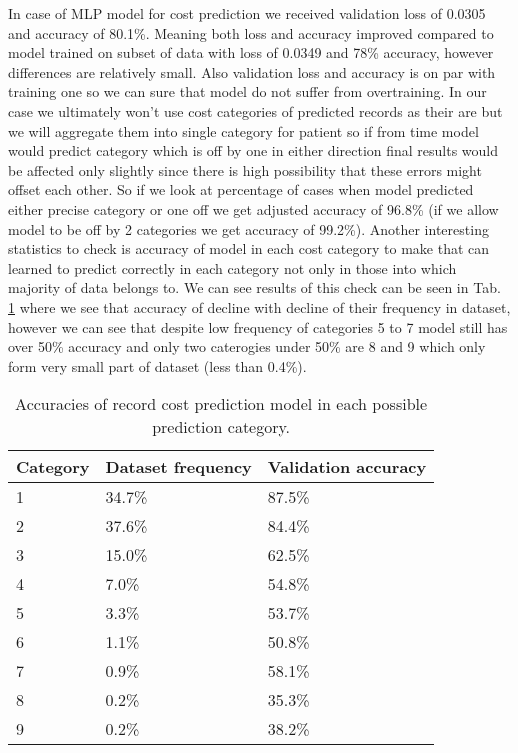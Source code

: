 In case of MLP model for cost prediction we received validation loss of 0.0305 and accuracy of 80.1\%. Meaning both loss and accuracy improved compared to model trained on subset of data with loss of 0.0349 and 78\% accuracy, however differences are relatively small. Also validation loss and accuracy is on par with training one so we can sure that model do not suffer from overtraining. In our case we ultimately won't use cost categories of predicted records as their are but we will aggregate them into single category for patient so if from time model would predict category which is off by one in either direction final results would be affected only slightly since there is high possibility that these errors might offset each other. So if we look at percentage of cases when model predicted either precise category or one off we get adjusted accuracy of 96.8\% (if we allow model to be off by 2 categories we get accuracy of 99.2\%). Another interesting statistics to check is accuracy of model in each cost category to make that can learned to predict correctly in each category not only in those into which majority of data belongs to. We can see results of this check can be seen in Tab. \ref{tab:cat_acc} where we see that accuracy of decline with decline of their frequency in dataset, however we can see that despite low frequency of categories 5 to 7 model still has over 50\% accuracy and only two caterogies under 50\% are 8 and 9 which only form very small part of dataset (less than 0.4\%).  
\\

\begin{table}[!h]
	\centering
	\begin{tabular}{|l|l|l|}
		\hline
		Category & Dataset frequency & Validation accuracy \\ \hline
		1        & 34.7\%           & 87.5\%              \\ \hline
		2        & 37.6\%           & 84.4\%              \\ \hline
		3        & 15.0\%           & 62.5\%              \\ \hline
		4        & 7.0\%            & 54.8\%              \\ \hline
		5        & 3.3\%            & 53.7\%              \\ \hline
		6        & 1.1\%            & 50.8\%              \\ \hline
		7        & 0.9\%            & 58.1\%              \\ \hline
		8        & 0.2\%            & 35.3\%              \\ \hline
		9        & 0.2\%            & 38.2\%              \\ \hline
	\end{tabular}
	\caption{Accuracies of record cost prediction model in each possible prediction category.}
	\label{tab:cat_acc}
\end{table}
 
